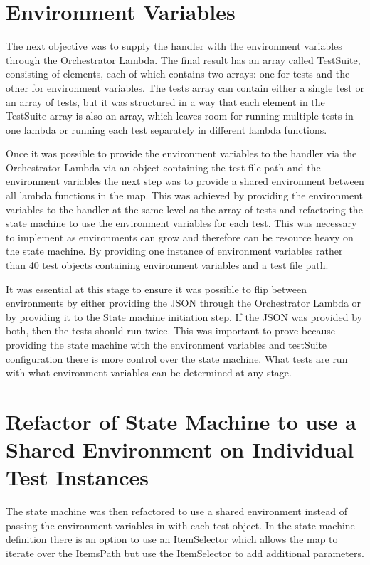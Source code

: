 \documentclass[12pt,a4paper,titlepage]{report}
\begin{document}
\section{Environment Variables}
The next objective was to supply the handler with the environment variables through the Orchestrator Lambda.
The final result has an array called TestSuite, consisting of elements, each of which contains two arrays: one for tests and the other for environment variables.
The tests array can contain either a single test or an array of tests, but it was structured in a way that each element in the TestSuite array is also an array,
which leaves room for running multiple tests in one lambda or running each test separately in different lambda functions.

Once it was possible to provide the environment variables to the handler via the Orchestrator Lambda via an
object containing the test file path and the environment variables the next step was to provide a shared environment
between all lambda functions in the map. This was achieved by providing the environment variables to the handler
at the same level as the array of tests and refactoring the state machine to use the environment variables for
each test. This was necessary to implement as environments can grow and therefore can be resource heavy on the
state machine. By providing one instance of environment variables rather than 40 test objects containing
environment variables and a test file path.

It was essential at this stage to ensure it was possible to flip between environments by either providing the JSON through the
Orchestrator Lambda or by providing it to the State machine initiation step. If the JSON was provided by both, then the tests should run twice.
This was important to prove because providing the state machine with the environment variables and testSuite configuration there is more control over the state
machine. What tests are run with what environment variables can be determined at any stage.

\section{Refactor of State Machine to use a Shared Environment on Individual Test Instances }

The state machine was then refactored to use a shared environment instead of
passing the environment variables in with each test object. In the state machine definition there is an option to
use an ItemSelector which allows the map to iterate over the ItemsPath but use the ItemSelector to add additional
parameters.
\end{document}
